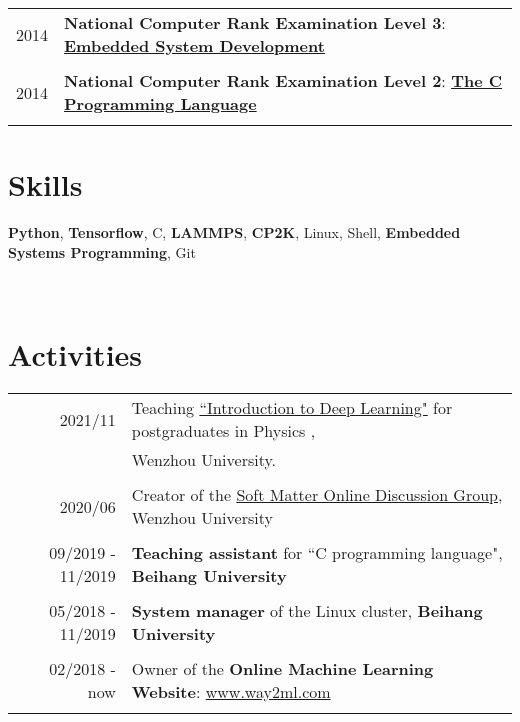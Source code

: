 \documentclass[a4paper,10pt]{article} %
\begin{document}
\begin{tabular}{r|l}
2014					& \textbf{National Computer Rank Examination Level 3}: \href{https://nbviewer.org/github/HuangJiaLian/DataBase0/blob/bffb5248aa974d5a5a0b1b5c9130951158f4f460/uPic/2021_11_26_11_6.png}{\textbf{Embedded System Development}}\\
\multicolumn{2}{c}{} \\	%

2014					& \textbf{National Computer Rank Examination Level 2}: \href{https://nbviewer.org/github/HuangJiaLian/DataBase0/blob/c19c03dbdc866420984cbe97a48893b40c02fa78/uPic/2021_11_26_11_5.png}{\textbf{The C Programming Language}}\\
\multicolumn{2}{c}{} \\	%
\end{tabular}

\section{Skills}
\begin{small}
\textbf{Python}, \textbf{Tensorflow}, C, \textbf{LAMMPS}, \textbf{CP2K}, Linux, Shell,  \textbf{Embedded Systems Programming}, Git
\end{small}
\\

\section{Activities}
\begin{tabular}{r|l}	
	2021/11                        & Teaching \href{https://github.com/way2ml/forum/discussions/13}{``Introduction to Deep Learning"} for postgraduates in Physics ,\\ & Wenzhou University.\\
	\multicolumn{2}{c}{} \\	%
	 
	
	2020/06                        & Creator of the \href{https://github.com/HuangJiaLian/SoftMatterDiscuss}{Soft Matter Online Discussion Group}, Wenzhou University\\
	\multicolumn{2}{c}{} \\	%
	
	09/2019 - 11/2019                     & \textbf{Teaching assistant }for  ``C programming language", \textbf{Beihang University} \\   	
	\multicolumn{2}{c}{} \\	%
	
	05/2018 - 11/2019                     & \textbf{System manager} of the Linux cluster,  \textbf{Beihang University}\\
	\multicolumn{2}{c}{} \\	%
	
	02/2018 - now                     & Owner of the \textbf{Online Machine Learning Website}: \href{www.way2ml.com}{www.way2ml.com} \\
	\multicolumn{2}{c}{} \\	%
\end{tabular}
\end{document}
